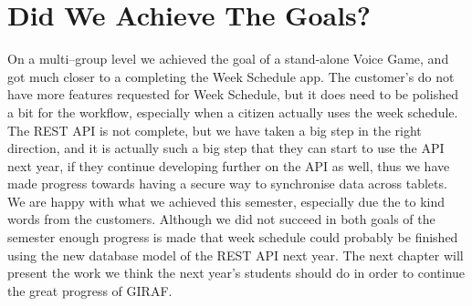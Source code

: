\section{Did We Achieve The Goals?}
On a multi--group level we achieved the goal of a stand-alone Voice Game, and got much closer to a completing the Week Schedule app.
The customer's do not have more features requested for Week Schedule, but it does need to be polished a bit for the workflow, especially when a citizen actually uses the week schedule.
The REST API is not complete, but we have taken a big step in the right direction, and it is actually such a big step that they can start to use the API next year, if they continue developing further on the API as well, thus we have made progress towards having a secure way to synchronise data across tablets.
We are happy with what we achieved this semester, especially due the to kind words from the customers.
Although we did not succeed in both goals of the semester enough progress is made that week schedule could probably be finished using the new database model of the REST API next year.
The next chapter will present the work we think the next year's students should do in order to continue the great progress of GIRAF.

